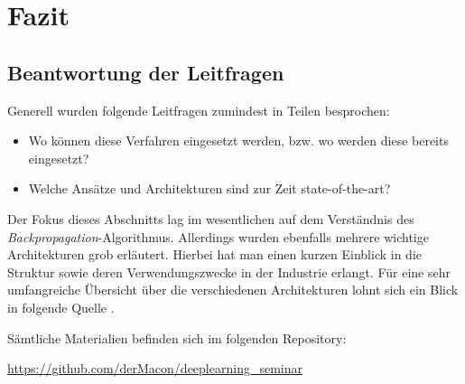 \section{Fazit}


\subsection{Beantwortung der Leitfragen}

Generell wurden folgende Leitfragen zumindest in Teilen besprochen: 

\begin{itemize}
\item Wo können diese Verfahren eingesetzt werden, bzw. wo werden diese bereits eingesetzt?
\item Welche Ansätze und Architekturen sind zur Zeit state-of-the-art?
\end{itemize}

Der Fokus dieses Abschnitts lag im wesentlichen auf dem Verständnis des \emph{Backpropagation}-Algorithmus. Allerdings wurden ebenfalls mehrere wichtige Architekturen grob erläutert. Hierbei hat man einen kurzen Einblick in die Struktur sowie deren Verwendungszwecke in der Industrie erlangt. Für eine sehr umfangreiche Übersicht über die verschiedenen Architekturen lohnt sich ein Blick in folgende Quelle \cite{archiOverview}.

\bigskip

Sämtliche Materialien befinden sich im folgenden Repository: 

\url{https://github.com/derMacon/deeplearning_seminar}
